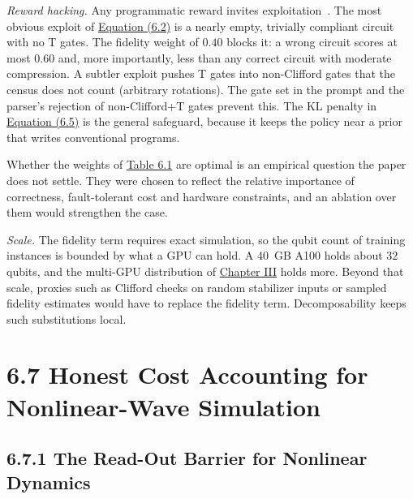 \documentclass{report}
\theoremstyle{plain}
\theoremstyle{definition}
\theoremstyle{remark}
\begin{document}
\emph{Reward hacking.} Any programmatic reward invites exploitation~\cite{skalse2022rewardhacking}. The most obvious exploit of \hyperref[eq:syn:rubric]{Equation (6.2)} is a nearly empty, trivially compliant circuit with no T gates. The fidelity weight of $0.40$ blocks it: a wrong circuit scores at most $0.60$ and, more importantly, less than any correct circuit with moderate compression. A subtler exploit pushes T gates into non-Clifford gates that the census does not count (arbitrary rotations). The gate set in the prompt and the parser's rejection of non-Clifford+T gates prevent this. The KL penalty in \hyperref[eq:syn:grpo]{Equation (6.5)} is the general safeguard, because it keeps the policy near a prior that writes conventional programs.

Whether the weights of \hyperref[tab:syn:rubric]{Table 6.1} are optimal is an empirical question the paper does not settle. They were chosen to reflect the relative importance of correctness, fault-tolerant cost and hardware constraints, and an ablation over them would strengthen the case.

\emph{Scale.} The fidelity term requires exact simulation, so the qubit count of training instances is bounded by what a GPU can hold. A 40~GB A100 holds about $32$ qubits, and the multi-GPU distribution of \hyperref[ch:qgear]{Chapter III} holds more. Beyond that scale, proxies such as Clifford checks on random stabilizer inputs or sampled fidelity estimates would have to replace the fidelity term. Decomposability keeps such substitutions local.

\section{6.7 Honest Cost Accounting for Nonlinear-Wave Simulation}\label{sec:syn:waves}

\subsection{6.7.1 The Read-Out Barrier for Nonlinear Dynamics}\label{sec:syn:waves-problem}
\end{document}
